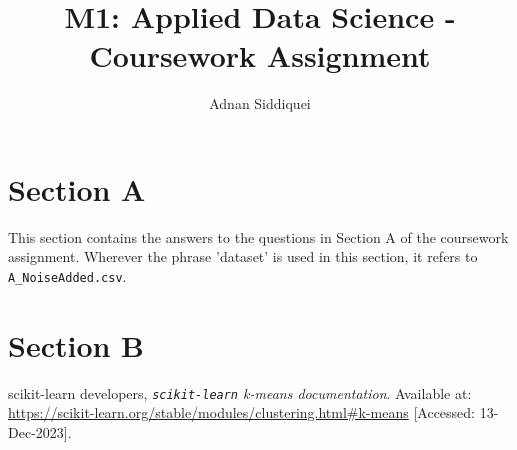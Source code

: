 \documentclass[a4paper,11pt]{article}
\title{\boldmath M1: Applied Data Science - Coursework Assignment}
\author{Adnan Siddiquei}
\affiliation{University of Cambridge}
\newcommand{\inlinecode}[1]{\lstinline{#1}}
\begin{document}
\maketitle
\flushbottom


\section{Section A}\label{sec:section-a}
This section contains the answers to the questions in Section A of the coursework assignment.
Wherever the phrase 'dataset' is used in this section, it refers to \inlinecode{A_NoiseAdded.csv}.




\section{Section B}\label{sec:section-b}



\begin{thebibliography}{99}

scikit-learn developers,
\textit{\inlinecode{scikit-learn} k-means documentation}.
Available at: \url{https://scikit-learn.org/stable/modules/clustering.html#k-means}
[Accessed: 13-Dec-2023].

\end{thebibliography}
\end{document}
